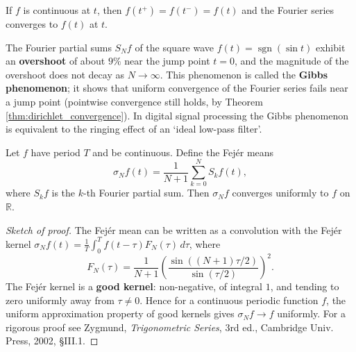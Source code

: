\begin{corollary}\label{cor:fourier_continuity}
If $f$ is continuous at $t$, then $f(t^+) = f(t^-) = f(t)$ and the Fourier series converges to $f(t)$ at $t$.
\end{corollary}

\begin{example}\label{ex:gibbs_phenomenon}
The Fourier partial sums $S_N f$ of the square wave $f(t) = \operatorname{sgn}(\sin t)$ exhibit an \textbf{overshoot} of about $9\%$ near the jump point $t = 0$, and the magnitude of the overshoot does not decay as $N \to \infty$. This phenomenon is called the \textbf{Gibbs phenomenon}; it shows that uniform convergence of the Fourier series fails near a jump point (pointwise convergence still holds, by Theorem \ref{thm:dirichlet_convergence}). In digital signal processing the Gibbs phenomenon is equivalent to the ringing effect of an `ideal low-pass filter'.
\end{example}

\begin{theorem}\label{thm:fejer_uniform}
Let $f$ have period $T$ and be continuous. Define the Fej\'er means
\[
\sigma_N f(t) = \frac{1}{N+1}\sum_{k=0}^{N} S_k f(t),
\]
where $S_k f$ is the $k$-th Fourier partial sum. Then $\sigma_N f$ converges uniformly to $f$ on $\mathbb{R}$.
\end{theorem}

\begin{proof}[Sketch of proof]
The Fej\'er mean can be written as a convolution with the Fej\'er kernel $\sigma_N f(t) = \frac{1}{T}\int_0^T f(t-\tau) F_N(\tau)\,d\tau$, where
\[
F_N(\tau) = \frac{1}{N+1}\left(\frac{\sin((N+1)\tau/2)}{\sin(\tau/2)}\right)^2.
\]
The Fej\'er kernel is a \textbf{good kernel}: non-negative, of integral $1$, and tending to zero uniformly away from $\tau \neq 0$. Hence for a continuous periodic function $f$, the uniform approximation property of good kernels gives $\sigma_N f \to f$ uniformly. For a rigorous proof see Zygmund, \textit{Trigonometric Series}, 3rd ed., Cambridge Univ. Press, 2002, \S{}III.1.
\end{proof}

